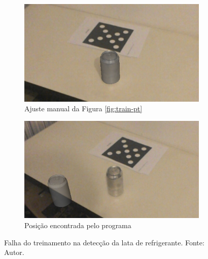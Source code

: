 \begin{figure}[ht]
\centering
    \begin{subfigure}{0.45\textwidth}
        \centering
        \includegraphics[width=.95\textwidth]{figuras/Latinha-ideal.png}
        \caption{Ajuste manual da Figura \ref{fig:train-pt}}
        \label{fig:ajuste-manual}
    \end{subfigure}
    \begin{subfigure}{0.45\textwidth}
        \includegraphics[width=.95\linewidth]{figuras/Latinha-errada.png}
        \caption{Posição encontrada pelo programa }
        \label{fig:estimation}
    \end{subfigure}
    \caption{Falha do treinamento na detecção da lata de refrigerante. Fonte: Autor.}
    \label{fig:pose-estimation}
\end{figure}


